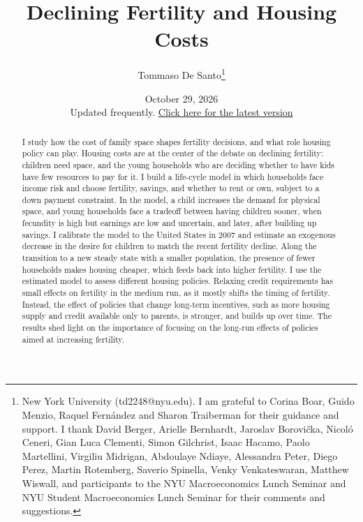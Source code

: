 \documentclass[11pt]{article}
\title{Declining Fertility and Housing Costs}
\author{Tommaso De Santo\thanks{New York University (td2248@nyu.edu). I am grateful to Corina Boar, Guido Menzio, Raquel Fernández and Sharon Traiberman for their guidance and support. I thank David Berger, Arielle Bernhardt, Jaroslav Borovička, Nicoló Ceneri, Gian Luca Clementi, Simon Gilchrist, Isaac Hacamo, Paolo Martellini, Virgiliu
		Midrigan, Abdoulaye Ndiaye, Alessandra Peter, Diego Perez, Martin Rotemberg, Saverio Spinella, Venky Venkateswaran, Matthew Wiswall, and participants to the NYU Macroeconomics Lunch Seminar and NYU Student Macroeconomics Lunch Seminar for their comments and suggestions.}}
\date{October 29, 2026\\[0.4em]\small Updated frequently. \href{https://tommasodesanto.github.io/jmp.pdf}{Click here for the latest version}}
\numberwithin{equation}{section}
\theoremstyle{definition}
\newcommand{\1}{\mathbf 1}
\begin{document}
\maketitle
\begin{abstract}
\noindent
I study how the cost of family space shapes fertility decisions, and what role housing policy can play. Housing costs are at the center of the debate on declining fertility: children need space, and the young households who are deciding whether to have kids have few resources to pay for it. I build a life-cycle model in which households face income risk and choose fertility, savings, and whether to rent or own, subject to a down payment constraint. In the model, a child increases the demand for physical space, and young households face a tradeoff between having children sooner, when fecundity is high but earnings are low and uncertain, and later, after building up savings. I calibrate the model to the United States in 2007 and estimate an exogenous decrease in the desire for children to match the recent fertility decline. Along the transition to a new steady state with a smaller population, the presence of fewer households makes housing cheaper, which feeds back into higher fertility. I use the estimated model to assess different housing policies. Relaxing credit requirements has small effects on fertility in the medium run, as it mostly shifts the timing of fertility. Instead, the effect of policies that change long-term incentives, such as more housing supply and credit available only to parents, is stronger, and builds up over time. The results shed light on the importance of focusing on the long-run effects of policies aimed at increasing fertility.

\end{abstract}
\vspace*{\fill}
\pagebreak
\end{document}
